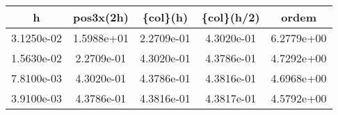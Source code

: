 \begin{table}[htb]
    \centering
    \begin{tabular}{@{}ccccc@{}}
        \toprule
        h & pos3x(2h) & \{col\}(h) & \{col\}(h/2) & ordem \\ \hline
        \midrule
        3.1250e-02 & 1.5988e+01 & 2.2709e-01 & 4.3020e-01 & 6.2779e+00 \\ \hline
        1.5630e-02 & 2.2709e-01 & 4.3020e-01 & 4.3786e-01 & 4.7292e+00 \\ \hline
        7.8100e-03 & 4.3020e-01 & 4.3786e-01 & 4.3816e-01 & 4.6968e+00 \\ \hline
        3.9100e-03 & 4.3786e-01 & 4.3816e-01 & 4.3817e-01 & 4.5792e+00 \\ \hline
        \bottomrule
    \end{tabular}
\end{table}
